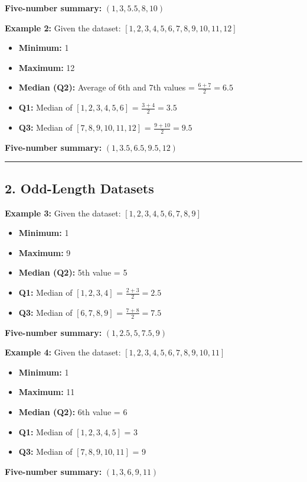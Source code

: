 \documentclass[a4paper,10pt]{article}
\begin{document}
\textbf{Five-number summary:} \((1, 3, 5.5, 8, 10)\)

\vspace{0.5cm}

\textbf{Example 2:}  
Given the dataset: \([1, 2, 3, 4, 5, 6, 7, 8, 9, 10, 11, 12]\)

\begin{itemize}
    \item \textbf{Minimum:} 1
    \item \textbf{Maximum:} 12
    \item \textbf{Median (Q2):} Average of 6th and 7th values = \(\frac{6+7}{2} = 6.5\)
    \item \textbf{Q1:} Median of \([1, 2, 3, 4, 5, 6]\) = \(\frac{3+4}{2} = 3.5\)
    \item \textbf{Q3:} Median of \([7, 8, 9, 10, 11, 12]\) = \(\frac{9+10}{2} = 9.5\)
\end{itemize}

\textbf{Five-number summary:} \((1, 3.5, 6.5, 9.5, 12)\)

\vspace{0.5cm}

\hrule
\vspace{0.5cm}

\subsection*{2. Odd-Length Datasets}

\textbf{Example 3:}  
Given the dataset: \([1, 2, 3, 4, 5, 6, 7, 8, 9]\)

\begin{itemize}
    \item \textbf{Minimum:} 1
    \item \textbf{Maximum:} 9
    \item \textbf{Median (Q2):} 5th value = 5
    \item \textbf{Q1:} Median of \([1, 2, 3, 4]\) = \(\frac{2+3}{2} = 2.5\)
    \item \textbf{Q3:} Median of \([6, 7, 8, 9]\) = \(\frac{7+8}{2} = 7.5\)
\end{itemize}

\textbf{Five-number summary:} \((1, 2.5, 5, 7.5, 9)\)

\vspace{0.5cm}

\textbf{Example 4:}  
Given the dataset: \([1, 2, 3, 4, 5, 6, 7, 8, 9, 10, 11]\)

\begin{itemize}
    \item \textbf{Minimum:} 1
    \item \textbf{Maximum:} 11
    \item \textbf{Median (Q2):} 6th value = 6
    \item \textbf{Q1:} Median of \([1, 2, 3, 4, 5]\) = 3
    \item \textbf{Q3:} Median of \([7, 8, 9, 10, 11]\) = 9
\end{itemize}

\textbf{Five-number summary:} \((1, 3, 6, 9, 11)\)
\end{document}
